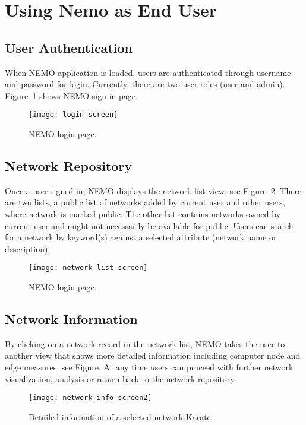 \section{Using Nemo as End User}

\subsection{User Authentication} 
When NEMO application is loaded, users are authenticated through username and password for login. Currently, there are two user roles (user and admin). Figure~\ref{fig:login-screen} shows NEMO sign in page.  

\begin{figure}[H]
\centering
\texttt{[image: login-screen]}
\caption{
NEMO login page.
}   %
\label{fig:login-screen}
\end{figure}

\subsection{Network Repository}
Once a user signed in, NEMO displays the network list view, see Figure~\ref{fig:network-list-screen}. There are two lists, a public list of networks added by current user and other users, where network is marked public. The other list contains networks owned by current user and might not necessarily be available for public. Users can search for a network by keyword(s) against a selected attribute (network name or description).

\begin{figure}[H]
\centering
\texttt{[image: network-list-screen]}
\caption{
NEMO login page.
}   %
\label{fig:network-list-screen}
\end{figure}


\subsection{Network Information}
By clicking on a network record in the network list, NEMO takes the user to another view that shows more detailed information including computer node and edge measures, see Figure. At any time users can proceed with further network visualization, analysis or return back to the network repository. 

\begin{figure}[H]
\centering
\texttt{[image: network-info-screen2]}
\caption{
Detailed information of a selected network Karate.
}   %
\label{fig:network-info-screen2}
\end{figure}

